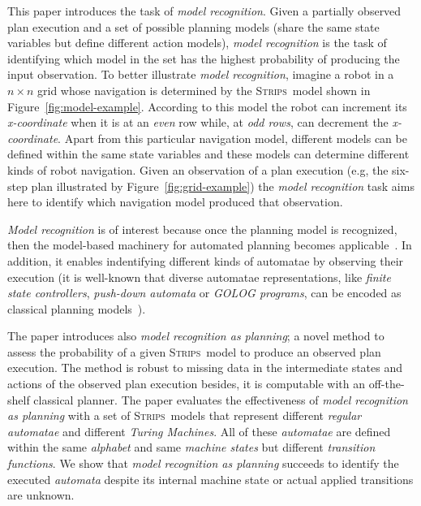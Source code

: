 \documentclass[letterpaper]{article} %
\newcommand{\strips}{\textsc{Strips}}     %
\begin{document}
This paper introduces the task of {\em model recognition}.  Given a partially observed plan execution and a set of possible planning models (share the same state variables but define different action models), {\em model recognition} is the task of identifying which model in the set has the highest probability of producing the input observation. To better illustrate {\em model recognition}, imagine a robot in a $n\times n$ grid whose navigation is determined by the \strips\ model shown in Figure~\ref{fig:model-example}. According to this model the robot can increment its {\em x-coordinate} when it is at an {\em even} row while, at {\em odd rows}, can decrement the {\em x-coordinate}. Apart from this particular navigation model, different models can be defined within the same state variables and these models can determine different kinds of robot navigation. Given an observation of a plan execution (e.g, the six-step plan illustrated by Figure~\ref{fig:grid-example}) the {\em model recognition} task aims here to identify which navigation model produced that observation. 

{\em Model recognition} is of interest because once the planning model is recognized, then the model-based machinery for automated planning becomes applicable~\cite{ghallab2004automated}. In addition, it enables indentifying different kinds of automatae by observing their execution (it is well-known that diverse automatae representations, like {\em finite state controllers}, {\em push-down automata} or {\em {\sc GOLOG} programs}, can be encoded as classical planning models~\cite{baier2007exploiting,Geffner:FSM:AAAI10,segovia2017generating}).

The paper introduces also {\em model recognition as planning}; a novel method to assess the probability of a given \strips\ model to produce an observed plan execution. The method is robust to missing data in the intermediate states and actions of the observed plan execution besides, it is computable with an off-the-shelf classical planner. The paper evaluates the effectiveness of {\em model recognition as planning} with a set of \strips\ models that represent different {\em regular automatae} and different {\em Turing Machines}. All of these {\em automatae} are defined within the same {\em alphabet} and same {\em machine states} but different {\em transition functions}. We show that {\em model recognition as planning} succeeds to identify the executed {\em automata} despite its internal machine state or actual applied transitions are unknown.
\end{document}
